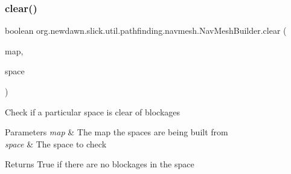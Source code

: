 \subsubsection{\texorpdfstring{clear()}{clear()}}
{\footnotesize\ttfamily boolean org.\+newdawn.\+slick.\+util.\+pathfinding.\+navmesh.\+Nav\+Mesh\+Builder.\+clear (\begin{DoxyParamCaption}\item[{\mbox{\hyperlink{interfaceorg_1_1newdawn_1_1slick_1_1util_1_1pathfinding_1_1_tile_based_map}{Tile\+Based\+Map}}}]{map,  }\item[{\mbox{\hyperlink{classorg_1_1newdawn_1_1slick_1_1util_1_1pathfinding_1_1navmesh_1_1_space}{Space}}}]{space }\end{DoxyParamCaption})\hspace{0.3cm}{\ttfamily [inline]}}

Check if a particular space is clear of blockages


\begin{DoxyParams}{Parameters}
{\em map} & The map the spaces are being built from \\
\hline
{\em space} & The space to check \\
\hline
\end{DoxyParams}
\begin{DoxyReturn}{Returns}
True if there are no blockages in the space 
\end{DoxyReturn}

